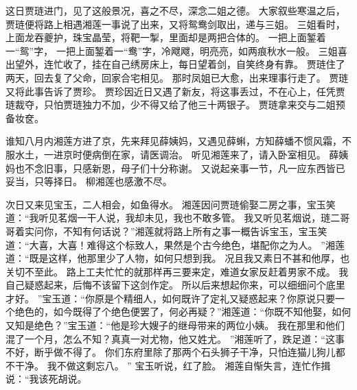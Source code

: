这日贾琏进门，见了这般景况，喜之不尽，深念二姐之德。
大家叙些寒温之后，贾琏便将路上相遇湘莲一事说了出来，又将鸳鸯剑取出，递与三姐。
三姐看时，上面龙吞夔护，珠宝晶莹，将靶一掣，里面却是两把合体的。
一把上面錾着一“鸳”字，
一把上面錾着一“鸯”字，冷飕飕，明亮亮，如两痕秋水一般。
三姐喜出望外，连忙收了，挂在自己绣房床上，每日望着剑，自笑终身有靠。
贾琏住了两天，回去复了父命，回家合宅相见。
那时凤姐已大愈，出来理事行走了。
贾琏又将此事告诉了贾珍。
贾珍因近日又遇了新友，将这事丢过，不在心上，任凭贾琏裁夺，只怕贾琏独力不加，少不得又给了他三十两银子。
贾琏拿来交与二姐预备妆奁。
\par
谁知八月内湘莲方进了京，先来拜见薛姨妈，又遇见薛蝌，方知薛蟠不惯风霜，不服水土，一进京时便病倒在家，请医调治。
听见湘莲来了，请入卧室相见。
薛姨妈也不念旧事，只感新恩，母子们十分称谢。
又说起亲事一节，凡一应东西皆已妥当，只等择日。
柳湘莲也感激不尽。
\par
次日又来见宝玉，二人相会，如鱼得水。
湘莲因问贾琏偷娶二房之事，宝玉笑道：“我听见茗烟一干人说，我却未见，我也不敢多管。
我又听见茗烟说，琏二哥哥着实问你，不知有何话说？”湘莲就将路上所有之事一概告诉宝玉，宝玉笑道：“大喜，大喜！难得这个标致人，果然是个古今绝色，堪配你之为人。
”湘莲道：“既是这样，他那里少了人物，如何只想到我。
况且我又素日不甚和他厚，也关切不至此。
路上工夫忙忙的就那样再三要来定，难道女家反赶着男家不成。
我自己疑惑起来，后悔不该留下这剑作定。
所以后来想起你来，可以细细问个底里才好。
”宝玉道：“你原是个精细人，如何既许了定礼又疑惑起来？你原说只要一个绝色的，如今既得了个绝色便罢了，何必再疑？”湘莲道：“你既不知他娶，如何又知是绝色？”宝玉道：“他是珍大嫂子的继母带来的两位小姨。
我在那里和他们混了一个月，怎么不知？真真一对尤物，他又姓尤。
”湘莲听了，跌足道：“这事不好，断乎做不得了。
你们东府里除了那两个石头狮子干净，只怕连猫儿狗儿都不干净。
我不做这剩忘八。
”
宝玉听说，红了脸。
湘莲自惭失言，连忙作揖说：“我该死胡说。
